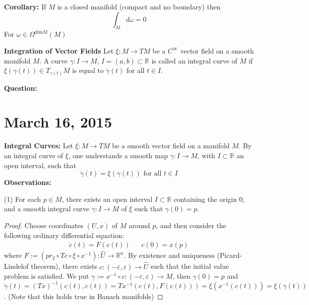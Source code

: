 \documentclass{article}
\begin{document}
\textbf{Corollary:} If $M$ is a closed manifold (compact and no boundary) then 
\[
\int_M d \omega = 0
\]
For $\omega \in \Omega^{\text{dim}M}(M)$

\textbf{Integration of Vector Fields}
Let $\xi: M \to TM$ be a $C^\infty$ vector field on a smooth manifold $M$. A curve $\gamma: I \to M$, $I = (a,b) \subset \mathbb{R}$ is called an integral curve of $M$ if $\xi(\gamma(t)) \in T_{\gamma(t)}M$ is equal to $\dot{\gamma}(t)$ for all $t \in I$.

\textbf{Question:}

\section{March 16, 2015}
\textbf{Integral Curves:} Let $\xi: M \to TM$ be a smooth vector field on a manifold $M$. By an integral curve of $\xi$, one understands a smooth map $\gamma: I \to M$, with $I \subset \mathbb{R}$ an open interval, such that
\[
\dot{\gamma}(t) = \xi(\gamma(t)) \text{ for all } t \in I
\]
\textbf{Observations:}

(1) For each $p \in M$, there exists an open interval $I \subset \mathbb{R}$ containing the origin 0, and a smooth integral curve $\gamma: I \to M$ of $\xi$ such that $\gamma(0) = p$.
\begin{proof}
Choose coordinates $(U,x)$ of $M$ around $p$, and then consider the following ordinary differential equation:
\begin{align*}
\dot{c}(t) = F(c(t)) & & c(0) = x(p)
\end{align*}
where $F := (pr_2 \circ Tc \circ \xi \circ x^{-1}): \hat{U} \to \mathbb{R}^n$. By existence and uniqueness (Picard-Lindelof theorem), there exists $c:(-\varepsilon, \varepsilon) \to \hat{U}$ such that the initial value problem is satisfied. We put $\gamma := x^{-1} \circ c: (-\varepsilon, \varepsilon) \to M$, then $\gamma(0) = p$ and $\dot{\gamma}(t) = (Tx)^{-1}(c(t), \dot{c}(t)) = Tx^{-1}(c(t), F(c(t))) = \xi(x^{-1}(c(t))) = \xi(\gamma(t))$. (Note that this holds true in Banach manifolds)
\end{proof}
\end{document}
